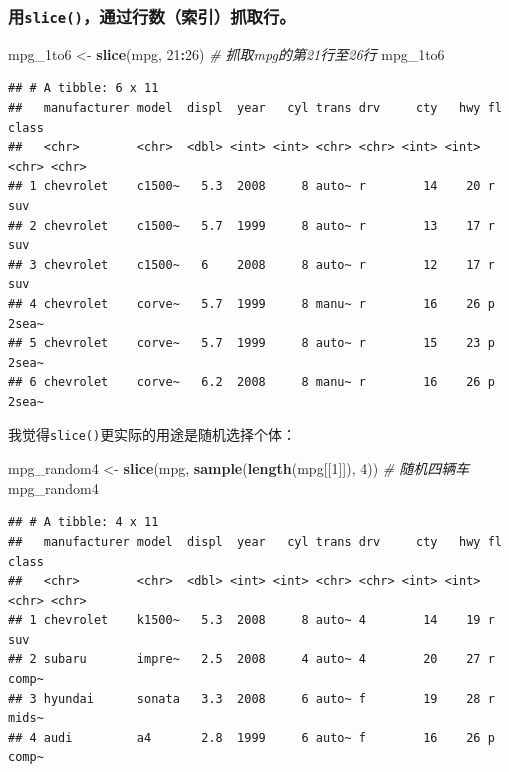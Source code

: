 \documentclass[]{book}
\newenvironment{Shaded}{\begin{snugshade}}{\end{snugshade}}
\newcommand{\CommentTok}[1]{\textcolor[rgb]{0.56,0.35,0.01}{\textit{#1}}}
\newcommand{\DecValTok}[1]{\textcolor[rgb]{0.00,0.00,0.81}{#1}}
\newcommand{\KeywordTok}[1]{\textcolor[rgb]{0.13,0.29,0.53}{\textbf{#1}}}
\newcommand{\NormalTok}[1]{#1}
\newcommand{\OperatorTok}[1]{\textcolor[rgb]{0.81,0.36,0.00}{\textbf{#1}}}
\newcommand{\StringTok}[1]{\textcolor[rgb]{0.31,0.60,0.02}{#1}}
\begin{document}
\hypertarget{slice}{%
\subsubsection{\texorpdfstring{用\texttt{slice()}，通过行数（索引）抓取行。}{用slice()，通过行数（索引）抓取行。}}\label{slice}}

\begin{Shaded}
\begin{Highlighting}[]
\NormalTok{mpg_1to6 <-}\StringTok{ }\KeywordTok{slice}\NormalTok{(mpg, }\DecValTok{21}\OperatorTok{:}\DecValTok{26}\NormalTok{) }\CommentTok{# 抓取mpg的第21行至26行}
\NormalTok{mpg_1to6}
\end{Highlighting}
\end{Shaded}

\begin{verbatim}
## # A tibble: 6 x 11
##   manufacturer model  displ  year   cyl trans drv     cty   hwy fl    class
##   <chr>        <chr>  <dbl> <int> <int> <chr> <chr> <int> <int> <chr> <chr>
## 1 chevrolet    c1500~   5.3  2008     8 auto~ r        14    20 r     suv  
## 2 chevrolet    c1500~   5.7  1999     8 auto~ r        13    17 r     suv  
## 3 chevrolet    c1500~   6    2008     8 auto~ r        12    17 r     suv  
## 4 chevrolet    corve~   5.7  1999     8 manu~ r        16    26 p     2sea~
## 5 chevrolet    corve~   5.7  1999     8 auto~ r        15    23 p     2sea~
## 6 chevrolet    corve~   6.2  2008     8 manu~ r        16    26 p     2sea~
\end{verbatim}

我觉得\texttt{slice()}更实际的用途是随机选择个体：

\begin{Shaded}
\begin{Highlighting}[]
\NormalTok{mpg_random4 <-}\StringTok{ }\KeywordTok{slice}\NormalTok{(mpg, }\KeywordTok{sample}\NormalTok{(}\KeywordTok{length}\NormalTok{(mpg[[}\DecValTok{1}\NormalTok{]]), }\DecValTok{4}\NormalTok{)) }\CommentTok{# 随机四辆车}
\NormalTok{mpg_random4}
\end{Highlighting}
\end{Shaded}

\begin{verbatim}
## # A tibble: 4 x 11
##   manufacturer model  displ  year   cyl trans drv     cty   hwy fl    class
##   <chr>        <chr>  <dbl> <int> <int> <chr> <chr> <int> <int> <chr> <chr>
## 1 chevrolet    k1500~   5.3  2008     8 auto~ 4        14    19 r     suv  
## 2 subaru       impre~   2.5  2008     4 auto~ 4        20    27 r     comp~
## 3 hyundai      sonata   3.3  2008     6 auto~ f        19    28 r     mids~
## 4 audi         a4       2.8  1999     6 auto~ f        16    26 p     comp~
\end{verbatim}
\end{document}
